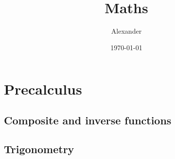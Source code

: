 \documentclass{article}
\title{Maths}
\author{Alexander}
\date{\today}
\begin{document}
\maketitle
\section*{Precalculus}

\subsection*{Composite and inverse functions}



\subsection*{Trigonometry}
\end{document}
